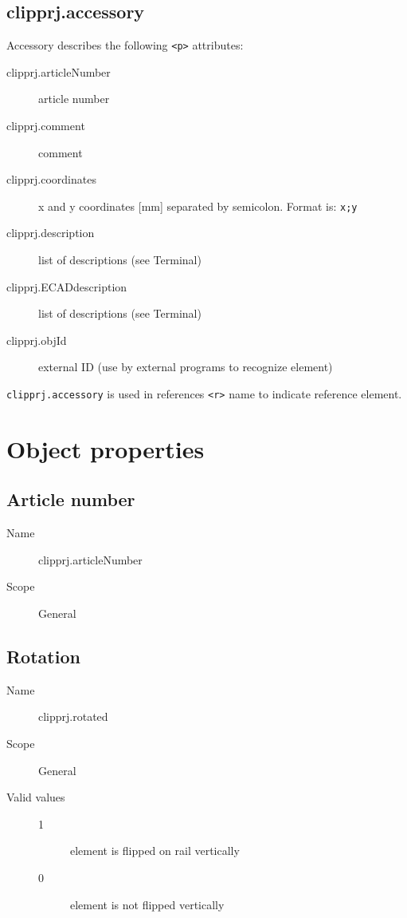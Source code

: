 \documentclass[%
	a4paper,
	oneside,
	listof=numbered,
	parskip=half,
	headsepline=true,
	footsepline=false,
	0.7headlines,
	]{scrbook}
\begin{document}
\subsection{clipprj.accessory}
 
Accessory describes the following \verb|<p>| attributes: 

\begin{description}
	\item[clipprj.articleNumber] article number 
	\item[clipprj.comment] comment 
	\item[clipprj.coordinates] x and y coordinates [mm] separated by semicolon.
	Format is: \verb|x;y|
	\item[clipprj.description] list of descriptions (see Terminal) 
	\item[clipprj.ECADdescription] list of descriptions (see Terminal) 
	\item[clipprj.objId] external ID (use by external programs to recognize element) 
\end{description}

\verb|clipprj.accessory| is used in references \verb|<r>| name to indicate reference element. 

\section{Object properties}

\subsection{Article number}

\begin{description}
	\item[Name] clipprj.articleNumber
	\item[Scope] General
\end{description}

\subsection{Rotation}

\begin{description}
	\item[Name] clipprj.rotated
	\item[Scope] General
	\item[Valid values]
	\begin{description}
		\item[1] element is flipped on rail vertically
		\item[0] element is not flipped vertically
	\end{description}
\end{description}
\end{document}
